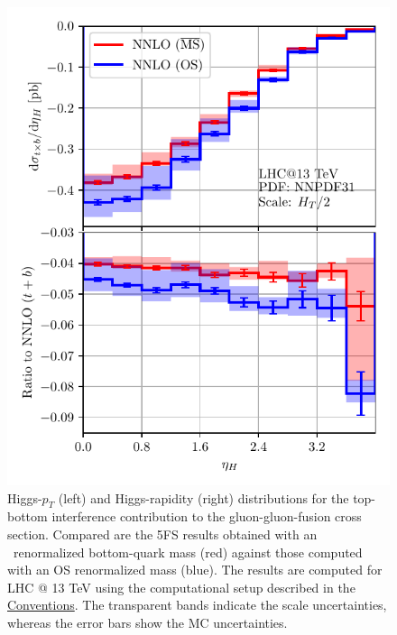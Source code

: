 \begin{figure}[ht]
\begin{minipage}[t]{0.49\textwidth}
  \includegraphics[width=\textwidth]{Images/yH_MS_OS_comparison_13000.pdf}
\end{minipage}
\caption{Higgs-$p_T$ (left) and Higgs-rapidity (right) distributions for the top-bottom interference contribution to the gluon-gluon-fusion cross section. Compared are the 5\acs{FS} results obtained with an \MS\ renormalized bottom-quark mass (red) against those computed with an \acs{OS} renormalized mass (blue). The results are computed for LHC @ 13 TeV using the computational setup described in the \hyperref[chap:notation_and_conventions]{Conventions}. The transparent bands indicate the scale uncertainties, whereas the error bars show the \acs{MC} uncertainties.}
\label{fig:6:pT_yH_OS_MS_comparison}
\end{figure}
%
